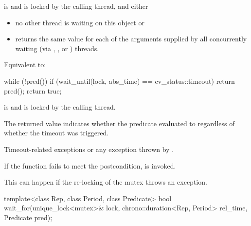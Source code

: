 \begin{itemdescr}
\pnum
\expects
{} is  and  is
locked by the calling thread, and either
\begin{itemize}
\item no other thread is waiting on this  object or
\item {} returns the same value for each of the 
arguments supplied by all concurrently waiting (via ,
, or ) threads.
\end{itemize}

\pnum
\effects
Equivalent to:
\begin{codeblock}
while (!pred())
  if (wait_until(lock, abs_time) == cv_status::timeout)
    return pred();
return true;
\end{codeblock}

\pnum
\ensures
{} is  and 
is locked by the calling thread.

\pnum
\begin{note}
The returned value indicates whether the predicate evaluated to
 regardless of whether the timeout was triggered.
\end{note}

\pnum
\throws
Timeout-related
exceptions or any exception thrown by .

\pnum
\remarks
If the function fails to meet the postcondition, 
is invoked.
\begin{note}
This can happen if the re-locking of the mutex throws an exception.
\end{note}
\end{itemdescr}

%
\begin{itemdecl}
template<class Rep, class Period, class Predicate>
  bool wait_for(unique_lock<mutex>& lock,
                chrono::duration<Rep, Period> rel_time,
                Predicate pred);
\end{itemdecl}

